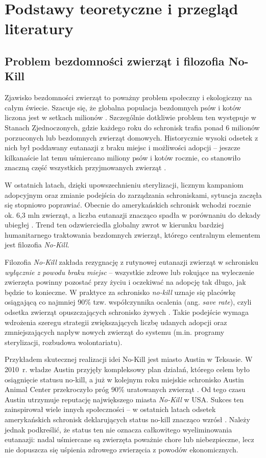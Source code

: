\chapter{Podstawy teoretyczne i przegląd literatury}
\label{chap:podstawy-teoretyczne}

\section{Problem bezdomności zwierząt i filozofia No-Kill}

Zjawisko bezdomności zwierząt to poważny problem społeczny i ekologiczny na całym świecie. Szacuje się, że globalna populacja bezdomnych psów i kotów liczona jest w setkach milionów \cite{FourPaws2023}. Szczególnie dotkliwie problem ten występuje w Stanach Zjednoczonych, gdzie każdego roku do schronisk trafia ponad 6 milionów porzuconych lub bezdomnych zwierząt domowych. Historycznie wysoki odsetek z nich był poddawany eutanazji z braku miejsc i możliwości adopcji – jeszcze kilkanaście lat temu uśmiercano miliony psów i kotów rocznie, co stanowiło znaczną część wszystkich przyjmowanych zwierząt \cite{Bradley2021}.

W ostatnich latach, dzięki upowszechnieniu sterylizacji, licznym kampaniom adopcyjnym oraz zmianie podejścia do zarządzania schroniskami, sytuacja zaczęła się stopniowo poprawiać. Obecnie do amerykańskich schronisk wchodzi rocznie ok. 6,3 mln zwierząt, a liczba eutanazji znacząco spadła w porównaniu do dekady ubiegłej \cite{SAC2024}. Trend ten odzwierciedla globalny zwrot w kierunku bardziej humanitarnego traktowania bezdomnych zwierząt, którego centralnym elementem jest filozofia \emph{No-Kill}.

Filozofia \emph{No-Kill} zakłada rezygnację z rutynowej eutanazji zwierząt w schronisku \textit{wyłącznie z powodu braku miejsc} – wszystkie zdrowe lub rokujące na wyleczenie zwierzęta powinny pozostać przy życiu i oczekiwać na adopcję tak długo, jak będzie to konieczne. W praktyce za schronisko \emph{no-kill} uznaje się placówkę osiągającą co najmniej 90\% tzw. współczynnika ocalenia (ang. \emph{save rate}), czyli odsetka zwierząt opuszczających schronisko żywych \cite{Austin2010}. Takie podejście wymaga wdrożenia szeregu strategii zwiększających liczbę udanych adopcji oraz zmniejszających napływ nowych zwierząt do systemu (m.in. programy sterylizacji, rozbudowa wolontariatu).

Przykładem skutecznej realizacji idei No-Kill jest miasto Austin w Teksasie. W 2010~r. władze Austin przyjęły kompleksowy plan działań, którego celem było osiągnięcie statusu no-kill, a już w kolejnym roku miejskie schronisko Austin Animal Center przekroczyło próg 90\% uratowanych zwierząt \cite{Austin2010}. Od tego czasu Austin utrzymuje reputację największego miasta \emph{No-Kill} w USA. Sukces ten zainspirował wiele innych społeczności – w ostatnich latach odsetek amerykańskich schronisk deklarujących status no-kill znacząco wzrósł \cite{SAC2024}. Należy jednak podkreślić, że status ten nie oznacza całkowitego wyeliminowania eutanazji: nadal uśmiercane są zwierzęta poważnie chore lub niebezpieczne, lecz nie dopuszcza się uśpienia zdrowego zwierzęcia z powodów ekonomicznych.

